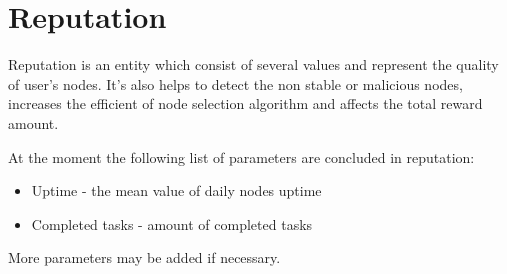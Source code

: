 \section{Reputation}

Reputation is an entity which consist of several values and represent the quality of user's nodes.
It's also helps to detect the non stable or malicious nodes,
increases the efficient of node selection algorithm and
affects the total reward amount.

At the moment the following list of parameters are concluded in reputation:

\begin{itemize}
    \item Uptime - the mean value of daily nodes uptime
    \item Completed tasks - amount of completed tasks
\end{itemize}

More parameters may be added if necessary.
